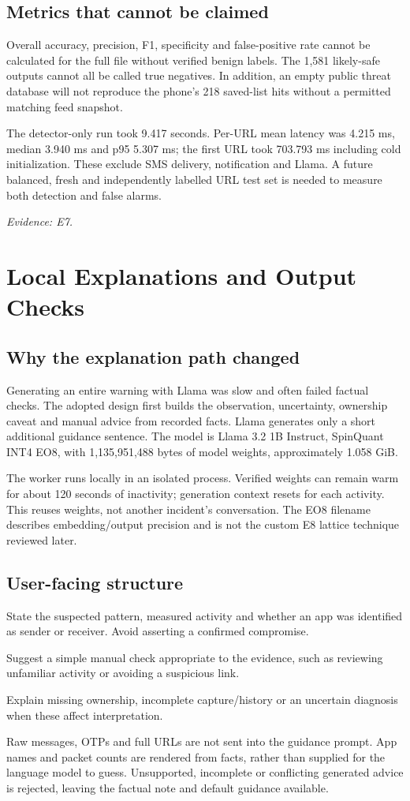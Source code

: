 \documentclass[11pt,a4paper]{article}
\newcommand{\source}[1]{{\small\textit{Evidence: #1.}\par}}
\newcommand{\chapterpage}[1]{\clearpage\section{#1}}
\begin{document}
\subsection*{Metrics that cannot be claimed}
Overall accuracy, precision, F1, specificity and false-positive rate cannot be calculated
for the full file without verified benign labels. The 1,581 likely-safe outputs cannot
all be called true negatives. In addition, an empty public threat database will not
reproduce the phone's 218 saved-list hits without a permitted matching feed snapshot.

The detector-only run took 9.417 seconds. Per-URL mean latency was 4.215 ms, median
3.940 ms and p95 5.307 ms; the first URL took 703.793 ms including cold initialization.
These exclude SMS delivery, notification and Llama. A future balanced, fresh and
independently labelled URL test set is needed to measure both detection and false alarms.
\source{E7}

\chapterpage{Local Explanations and Output Checks}
\subsection*{Why the explanation path changed}
Generating an entire warning with Llama was slow and often failed factual checks.
The adopted design first builds the observation, uncertainty, ownership caveat and
manual advice from recorded facts. Llama generates only a short additional guidance
sentence. The model is Llama 3.2 1B Instruct, SpinQuant INT4 EO8, with
1,135,951,488 bytes of model weights, approximately 1.058 GiB.

The worker runs locally in an isolated process. Verified weights can remain warm for
about 120 seconds of inactivity; generation context resets for each activity.
This reuses weights, not another incident's conversation. The EO8 filename describes
embedding/output precision and is not the custom E8 lattice technique reviewed later.

\subsection*{User-facing structure}
\begin{description}[style=nextline,leftmargin=0pt]
\item[What happened] State the suspected pattern, measured activity and whether an app
was identified as sender or receiver. Avoid asserting a confirmed compromise.
\item[What to do] Suggest a simple manual check appropriate to the evidence, such as
reviewing unfamiliar activity or avoiding a suspicious link.
\item[What remains unknown] Explain missing ownership, incomplete capture/history or an
uncertain diagnosis when these affect interpretation.
\end{description}
Raw messages, OTPs and full URLs are not sent into the guidance prompt. App names and
packet counts are rendered from facts, rather than supplied for the language model to
guess. Unsupported, incomplete or conflicting generated advice is rejected, leaving
the factual note and default guidance available.
\end{document}
